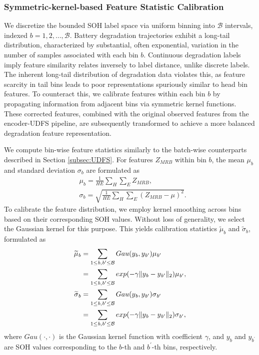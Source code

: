 \documentclass[lettersize,journal]{IEEEtran}
\begin{document}
\subsubsection{Symmetric-kernel-based Feature Statistic Calibration}

We discretize the bounded SOH label space via uniform binning into $\mathcal{B}$ intervals, indexed $\textit{b} = 1, 2, \dots, \mathcal{B}$. Battery degradation trajectories exhibit a long-tail distribution, characterized by substantial, often exponential, variation in the number of samples associated with each bin $\textit{b}$.
% 
Continuous degradation labels imply feature similarity relates inversely to label distance, unlike discrete labels. 
% 
The inherent long-tail distribution of degradation data violates this, as feature scarcity in tail bins leads to poor representations spuriously similar to head bin features.
% 
To counteract this, we calibrate features within each bin $\textit{b}$ by propagating information from adjacent bins via symmetric kernel functions. These corrected features, combined with the original observed features from the encoder-UDFS pipeline, are subsequently transformed to achieve a more balanced degradation feature representation.

We compute bin-wise feature statistics similarly to the batch-wise counterparts described in Section \ref{subsec:UDFS}. For features $Z_{MRB}$ within bin $\textit{b}$, the mean $\mu_{\textit{b}}$ and standard deviation $\sigma_{\textit{b}}$ are formulated as
\begin{align}
    & \mu_{\textit{b}} = \frac{1}{HE}\sum_{H}\sum_{E}Z_{MRB}, \\
    & \sigma_{\textit{b}} = \sqrt{\frac{1}{HE}\sum_{H}\sum_{E}(Z_{MRB} - \mu)^{2}}.
\end{align}
% 
To calibrate the feature distribution, we employ kernel smoothing across bins based on their corresponding SOH values. Without loss of generality, we select the Gaussian kernel for this purpose. This yields calibration statistics $\widetilde{\mu}_{\textit{b}}$ and $\widetilde{\sigma}_{\textit{b}}$, formulated as
\begin{align}
    \widetilde{\mu}_{\textit{b}} & = \sum_{1 \leq \textit{b}, \textit{b}^{\prime} \leq \mathcal{B}}Gau(y_{\textit{b}}, y_{\textit{b}^{\prime}})\mu_{\textit{b}^{\prime}} \notag \\
    & = \sum_{1 \leq \textit{b}, \textit{b}^{\prime} \leq \mathcal{B}}exp(-\gamma\|y_{\textit{b}} - y_{\textit{b}^{\prime}}\|_{2})\mu_{\textit{b}^{\prime}},\label{mu_calibration} \\
    \widetilde{\sigma}_{\textit{b}} & = \sum_{1 \leq \textit{b}, \textit{b}^{\prime} \leq \mathcal{B}}Gau(y_{\textit{b}}, y_{\textit{b}^{\prime}})\sigma_{\textit{b}^{\prime}} \notag \\
    & = \sum_{1 \leq \textit{b}, \textit{b}^{\prime} \leq \mathcal{B}}exp(-\gamma\|y_{\textit{b}} - y_{\textit{b}^{\prime}}\|_{2})\sigma_{\textit{b}^{\prime}},\label{sigma_calibration}
\end{align}
where $Gau(\cdot, \cdot)$ is the Gaussian kernel function with coefficient $\gamma$, and $y_{\textit{b}}$ and $y_{\textit{b}^{\prime}}$ are SOH values corresponding to the $\textit{b}$-th and $\textit{b}^{\prime}$-th bins, respectively.
\end{document}
